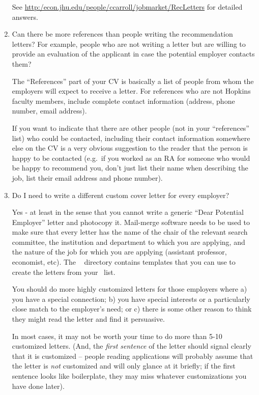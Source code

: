 \documentclass{econtex}
\begin{document}
\begin{enumerate}
See \url{http:/econ.jhu.edu/people/ccarroll/jobmarket/RecLetters} for detailed answers.


\item  Can there be more references than people writing the recommendation 
 letters? For example, people who are not writing a letter but are willing to provide 
 an evaluation of the applicant in case the potential employer contacts them?

 The ``References'' part of your CV is basically a list of people from
 whom the employers will expect to receive a letter.  For references who
 are not Hopkins faculty members, include complete contact information
 (address, phone number, email address).

 If you want to indicate that there are other people (not in your
 ``references'' list) who could be contacted, including their contact
 information somewhere else on the CV is a very obvious suggestion to
 the reader that the person is happy to be contacted (e.g.\ if you
 worked as an RA for someone who would be happy to recommend you,
 don't just list their name when describing the job, list their email
 address and phone number).


\item Do I need to write a different custom cover letter for every employer?
  
  Yes - at least in the sense that you cannot write a generic ``Dear Potential Employer'' letter
  and photocopy it.  Mail-merge software needs to be used to make sure
  that every letter has the name of the chair of the relevant search
  committee, the institution and department to which you are applying,
  and the nature of the job for which you are applying (assistant
  professor, economist, etc).  The \Templates~ directory contains templates that 
you can use to create the letters from your \EM~list.  
  
  You should do more highly customized letters for those employers
  where a) you have a special connection; b) you have special
  interests or a particularly close match to the employer's need; or
  c) there is some other reason to think they might read the letter
  and find it persuasive.  

  In most cases, it may not be worth your time to do more than
  5-10 customized letters.  (And, the {\it first sentence} of the letter should signal
clearly that it is customized -- people reading applications will probably assume that the letter is {\it not} customized and will only glance at it briefly; if the first sentence looks like boilerplate, they may miss whatever customizations you have done later).


\end{enumerate}
\end{document}
